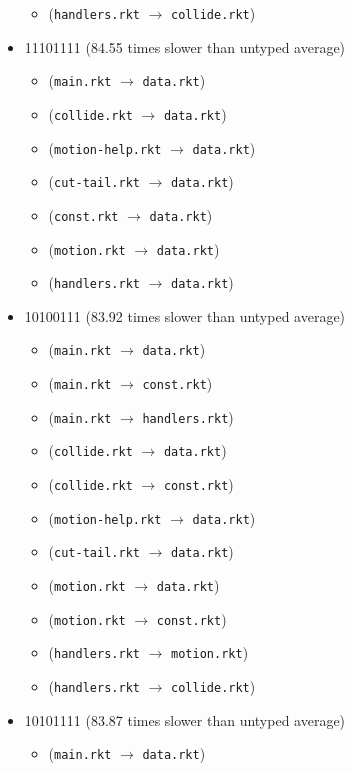 \documentclass{article}
\newcommand{\mono}[1]{\texttt{#1}}
\begin{document}
\begin{itemize}
\begin{itemize}
  \item (\mono{handlers.rkt} $\rightarrow$ \mono{collide.rkt})
  \end{itemize}
\item 11101111 (84.55 times slower than untyped average)
  \begin{itemize}
  \item (\mono{main.rkt} $\rightarrow$ \mono{data.rkt})
  \item (\mono{collide.rkt} $\rightarrow$ \mono{data.rkt})
  \item (\mono{motion-help.rkt} $\rightarrow$ \mono{data.rkt})
  \item (\mono{cut-tail.rkt} $\rightarrow$ \mono{data.rkt})
  \item (\mono{const.rkt} $\rightarrow$ \mono{data.rkt})
  \item (\mono{motion.rkt} $\rightarrow$ \mono{data.rkt})
  \item (\mono{handlers.rkt} $\rightarrow$ \mono{data.rkt})
  \end{itemize}
\item 10100111 (83.92 times slower than untyped average)
  \begin{itemize}
  \item (\mono{main.rkt} $\rightarrow$ \mono{data.rkt})
  \item (\mono{main.rkt} $\rightarrow$ \mono{const.rkt})
  \item (\mono{main.rkt} $\rightarrow$ \mono{handlers.rkt})
  \item (\mono{collide.rkt} $\rightarrow$ \mono{data.rkt})
  \item (\mono{collide.rkt} $\rightarrow$ \mono{const.rkt})
  \item (\mono{motion-help.rkt} $\rightarrow$ \mono{data.rkt})
  \item (\mono{cut-tail.rkt} $\rightarrow$ \mono{data.rkt})
  \item (\mono{motion.rkt} $\rightarrow$ \mono{data.rkt})
  \item (\mono{motion.rkt} $\rightarrow$ \mono{const.rkt})
  \item (\mono{handlers.rkt} $\rightarrow$ \mono{motion.rkt})
  \item (\mono{handlers.rkt} $\rightarrow$ \mono{collide.rkt})
  \end{itemize}
\item 10101111 (83.87 times slower than untyped average)
  \begin{itemize}
  \item (\mono{main.rkt} $\rightarrow$ \mono{data.rkt})

\end{itemize}
\end{itemize}
\end{document}
